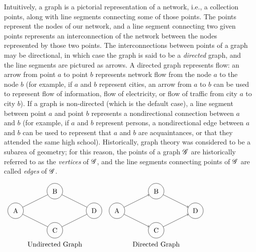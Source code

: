 Intuitively, a graph is a pictorial representation of a network, i.e., a collection points, along with line segments connecting some of those points. The points represent the nodes of our network, and a line segment connecting two given points represents an interconnection of the network between the nodes represented by those two points. The interconnections between points of a graph may be directional, in which case the graph is said to be a \emph{directed} graph, and the line segments are pictured as arrows. A directed graph represents flow: an arrow from point $a$ to point $b$  represents network flow from the node $a$ to the node $b$ (for example, if $a$ and $b$ represent cities, an arrow from $a$ to $b$  can be used to represent flow of information, flow of electricity, or flow of traffic from city $a$ to city $b$). If a graph is non-directed (which is the default case), a line segment between point $a$ and point $b$ represents a nondirectional connection between $a$ and $b$ (for example, if $a$ and $b$ represent persons, a nondirectional edge between $a$ and $b$ can be used to represent that $a$ and $b$ are acquaintances, or that they attended the same high school). Historically, graph theory was considered to be a subarea of geometry; for this reason, the points of a graph $\mathscr{G}$ are historically referred to as the \emph{vertices} of $\mathscr{G}$, and the line segments connecting points of $\mathscr{G}$ are called \emph{edges} of $\mathscr{G}$.

\begin{center} $ \begin{array}{cc}
\begin{tikzpicture}[every node/.style={circle, draw, minimum size=8mm}]
  \node (a) at (0,0) {A};
  \node (b) at (2,1) {B};
  \node (c) at (2,-1) {C};
  \node (d) at (4,0) {D};

  \draw (a) -- (b);
  \draw (a) -- (c);
  \draw (b) -- (d);
  \draw (c) -- (d);
\end{tikzpicture}
&
\begin{tikzpicture}[every node/.style={circle, draw, minimum size=8mm}]
  \node (a) at (0,0) {A};
  \node (b) at (2,1) {B};
  \node (c) at (2,-1) {C};
  \node (d) at (4,0) {D};

  \draw[->] (a) -- (b);
  \draw[->] (a) -- (c);
  \draw[->] (b) -- (d);
  \draw[->] (c) -- (d);
\end{tikzpicture}
\\
\text{Undirected Graph} & \text{Directed Graph}
\end{array} $ \end{center}

